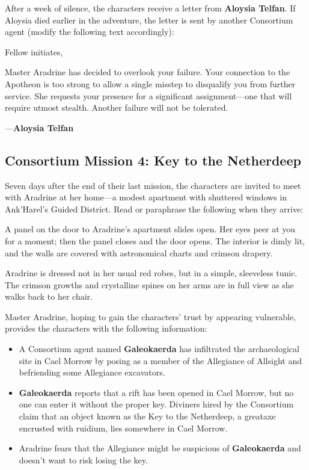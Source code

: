 \documentclass[10pt,a4paper,twoside,bg=print,twocolumn,openany,nodeprecatedcode]{dndbook}
\begin{document}
After a week of silence, the characters receive a letter from \textbf{Aloysia Telfan}. If Aloysia died earlier in the adventure, the letter is sent by another Consortium agent (modify the following text accordingly):

\begin{DndReadAloud}{}
Fellow initiates,

Master Aradrine has decided to overlook your failure. Your connection to the Apotheon is too strong to allow a single misstep to disqualify you from further service. She requests your presence for a significant assignment—one that will require utmost stealth. Another failure will not be tolerated.

—\textbf{Aloysia Telfan}

\end{DndReadAloud}

\subsection{Consortium Mission 4: Key to the Netherdeep}
Seven days after the end of their last mission, the characters are invited to meet with Aradrine at her home—a modest apartment with shuttered windows in Ank'Harel's Guided District. Read or paraphrase the following when they arrive:

\begin{DndReadAloud}{}
A panel on the door to Aradrine's apartment slides open. Her eyes peer at you for a moment; then the panel closes and the door opens. The interior is dimly lit, and the walls are covered with astronomical charts and crimson drapery.

Aradrine is dressed not in her usual red robes, but in a simple, sleeveless tunic. The crimson growths and crystalline spines on her arms are in full view as she walks back to her chair.

\end{DndReadAloud}

Master Aradrine, hoping to gain the characters' trust by appearing vulnerable, provides the characters with the following information:


\begin{itemize}
\item A Consortium agent named \textbf{Galeokaerda} has infiltrated the archaeological site in Cael Morrow by posing as a member of the Allegiance of Allsight and befriending some Allegiance excavators.
\item \textbf{Galeokaerda} reports that a rift has been opened in Cael Morrow, but no one can enter it without the proper key. Diviners hired by the Consortium claim that an object known as the Key to the Netherdeep, a greataxe encrusted with ruidium, lies somewhere in Cael Morrow.
\item Aradrine fears that the Allegiance might be suspicious of \textbf{Galeokaerda} and doesn't want to risk losing the key.
\end{itemize}
\end{document}
